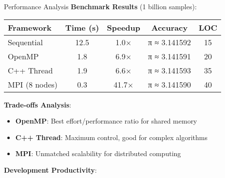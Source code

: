 \begin{frame}[fragile]{ Performance Analysis}
	\textbf{Benchmark Results} (1 billion samples):

	\begin{table}[h]
		\centering
		\begin{tabular}{|l|c|c|c|c|}
			\hline
			\textbf{Framework} & \textbf{Time (s)} & \textbf{Speedup} & \textbf{Accuracy} & \textbf{LOC} \\
			\hline
			Sequential         & 12.5              & 1.0×             & π ≈ 3.141592      & 15           \\
			OpenMP             & 1.8               & 6.9×             & π ≈ 3.141591      & 20           \\
			C++ Thread         & 1.9               & 6.6×             & π ≈ 3.141593      & 35           \\
			MPI (8 nodes)      & 0.3               & 41.7×            & π ≈ 3.141590      & 40           \\
			\hline
		\end{tabular}
	\end{table}

	\vspace{1em}
	\textbf{Trade-offs Analysis}:
	\begin{itemize}
		\item \textbf{OpenMP}: Best effort/performance ratio for shared memory
		\item \textbf{C++ Thread}: Maximum control, good for complex algorithms
		\item \textbf{MPI}: Unmatched scalability for distributed computing
	\end{itemize}

	\vspace{0.5em}
	\textbf{Development Productivity}:
\end{frame}

